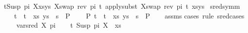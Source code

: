 \begin{isabellebody}
{\isachardoublequoteopen}{\isacharparenleft}{\kern0pt}{\isacharparenleft}{\kern0pt}t{\isasymapprox}{\isacharquery}{\kern0pt}Susp\ pi\ X{\isacharparenright}{\kern0pt}{\isacharhash}{\kern0pt}xs{\isacharcomma}{\kern0pt}ys{\isacharparenright}{\kern0pt}\ {\isasymturnstile}{\isacharbrackleft}{\kern0pt}{\isacharparenleft}{\kern0pt}X{\isacharcomma}{\kern0pt}swap\ {\isacharparenleft}{\kern0pt}rev\ pi{\isacharparenright}{\kern0pt}\ t{\isacharparenright}{\kern0pt}{\isacharbrackright}{\kern0pt}{\isasymleadsto}\ apply{\isacharunderscore}{\kern0pt}subst\ {\isacharbrackleft}{\kern0pt}{\isacharparenleft}{\kern0pt}X{\isacharcomma}{\kern0pt}swap\ {\isacharparenleft}{\kern0pt}rev\ pi{\isacharparenright}{\kern0pt}\ t{\isacharparenright}{\kern0pt}{\isacharbrackright}{\kern0pt}\ {\isacharparenleft}{\kern0pt}xs{\isacharcomma}{\kern0pt}ys{\isacharparenright}{\kern0pt}{\isachardoublequoteclose}\isanewline
\isanewline
\isanewline
{}\isamarkupfalse%
\ sred{\isacharunderscore}{\kern0pt}symm{\isacharcolon}{\kern0pt}\isanewline
\ \ \ {\isachardoublequoteopen}{\isacharparenleft}{\kern0pt}{\isacharparenleft}{\kern0pt}t{}\ {\isasymapprox}{\isacharquery}{\kern0pt}\ t{}{\isacharparenright}{\kern0pt}\ {\isacharhash}{\kern0pt}\ xs{\isacharcomma}{\kern0pt}\ ys{\isacharparenright}{\kern0pt}\ {\isasymturnstile}\ s\ {\isasymleadsto}\ P{}{\isachardoublequoteclose}\isanewline
\ \ \ {\isachardoublequoteopen}{\isasymexists}\ P{}{\isachardot}{\kern0pt}\ {\isacharparenleft}{\kern0pt}{\isacharparenleft}{\kern0pt}t{}\ {\isasymapprox}{\isacharquery}{\kern0pt}\ t{}{\isacharparenright}{\kern0pt}\ {\isacharhash}{\kern0pt}\ xs{\isacharcomma}{\kern0pt}\ ys{\isacharparenright}{\kern0pt}\ {\isasymturnstile}\ s\ {\isasymleadsto}\ P{}{\isachardoublequoteclose}\isanewline
%
\isadelimproof
\ \ %
\endisadelimproof
%
\isatagproof
{}\isamarkupfalse%
\ assms\isanewline
{}\isamarkupfalse%
{\isacharparenleft}{\kern0pt}cases\ rule{\isacharcolon}{\kern0pt}\ s{\isacharunderscore}{\kern0pt}red{\isachardot}{\kern0pt}cases{\isacharparenright}{\kern0pt}\isanewline
\ \ \isamarkupfalse%
\ {\isacharparenleft}{\kern0pt}var{\isacharunderscore}{\kern0pt}{}{\isacharunderscore}{\kern0pt}sred\ X\ pi{\isacharparenright}{\kern0pt}\isanewline
\ \ \isamarkupfalse%
\ {\isachardoublequoteopen}{\isacharparenleft}{\kern0pt}{\isacharparenleft}{\kern0pt}t{}{\isacharcomma}{\kern0pt}\ Susp\ pi\ X{\isacharparenright}{\kern0pt}\ {\isacharhash}{\kern0pt}\ xs{\isacharcomma}{\kern0pt}\isanewline

\end{isabellebody}
